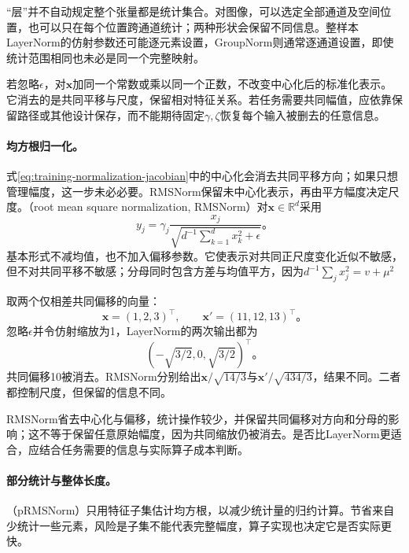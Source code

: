 “层”并不自动规定整个张量都是统计集合。对图像，可以选定全部通道及空间位置，也可以只在每个位置跨通道统计；两种形状会保留不同信息。整样本LayerNorm的仿射参数还可能逐元素设置，GroupNorm则通常逐通道设置，即使统计范围相同也未必是同一个完整映射。

若忽略$\epsilon$，对$\bm x$加同一个常数或乘以同一个正数，不改变中心化后的标准化表示。它消去的是共同平移与尺度，保留相对特征关系。若任务需要共同幅值，应依靠保留路径或其他设计保存，而不能期待固定$\gamma,\zeta$恢复每个输入被删去的任意信息。

\paragraph{均方根归一化。}

式\eqref{eq:training-normalization-jacobian}中的中心化会消去共同平移方向；如果只想管理幅度，这一步未必必要。RMSNorm保留未中心化表示，再由平方幅度决定尺度。（root mean square normalization, RMSNorm）对$\bm x\in\mathbb R^d$采用
\begin{equation}
  y_j=\gamma_j\frac{x_j}{\sqrt{d^{-1}\sum_{k=1}^d x_k^2+\epsilon}}\text{。}
  \label{eq:training-rmsnorm}
\end{equation}
基本形式不减均值，也不加入偏移参数。它使表示对共同正尺度变化近似不敏感，但不对共同平移不敏感；分母同时包含方差与均值平方，因为$d^{-1}\sum_jx_j^2=v+\mu^2$

\begin{example}[减去均值改变了哪些信息]
  \label{ex:training-layer-rms}
  取两个仅相差共同偏移的向量：
  \[
    \bm x=(1,2,3)^{\top},\qquad \bm x'=(11,12,13)^{\top}\text{。}
  \]
  忽略$\epsilon$并令仿射缩放为1，LayerNorm的两次输出都为
  \[
    (-\sqrt{3/2},0,\sqrt{3/2})^{\top}\text{。}
  \]
  共同偏移10被消去。RMSNorm分别给出$\bm x/\sqrt{14/3}$与$\bm x'/\sqrt{434/3}$，结果不同。二者都控制尺度，但保留的信息不同。
\end{example}

RMSNorm省去中心化与偏移，统计操作较少，并保留共同偏移对方向和分母的影响；这不等于保留任意原始幅度，因为共同缩放仍被消去。是否比LayerNorm更适合，应结合任务需要的信息与实际算子成本判断。

\paragraph{部分统计与整体长度。}

（pRMSNorm）只用特征子集估计均方根，以减少统计量的归约计算。节省来自少统计一些元素，风险是子集不能代表完整幅度，算子实现也决定它是否实际更快。

